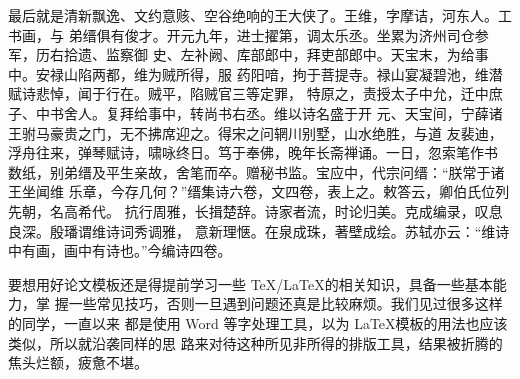 \documentclass[../Main/thesis.tex]{subfiles}
\begin{document}
最后就是清新飘逸、文约意赅、空谷绝响的王大侠了。王维，字摩诘，河东人。工书画，与
弟缙俱有俊才。开元九年，进士擢第，调太乐丞。坐累为济州司仓参军，历右拾遗、监察御
史、左补阙、库部郎中，拜吏部郎中。天宝末，为给事中。安禄山陷两都，维为贼所得，服
药阳喑，拘于菩提寺。禄山宴凝碧池，维潜赋诗悲悼，闻于行在。贼平，陷贼官三等定罪，
特原之，责授太子中允，迁中庶子、中书舍人。复拜给事中，转尚书右丞。维以诗名盛于开
元、天宝间，宁薛诸王驸马豪贵之门，无不拂席迎之。得宋之问辋川别墅，山水绝胜，与道
友裴迪，浮舟往来，弹琴赋诗，啸咏终日。笃于奉佛，晚年长斋禅诵。一日，忽索笔作书
数纸，别弟缙及平生亲故，舍笔而卒。赠秘书监。宝应中，代宗问缙：“朕常于诸王坐闻维
乐章，今存几何？”缙集诗六卷，文四卷，表上之。敕答云，卿伯氏位列先朝，名高希代。
抗行周雅，长揖楚辞。诗家者流，时论归美。克成编录，叹息良深。殷璠谓维诗词秀调雅，
意新理惬。在泉成珠，著壁成绘。苏轼亦云：“维诗中有画，画中有诗也。”今编诗四卷。

要想用好论文模板还是得提前学习一些 \TeX/\LaTeX{}的相关知识，具备一些基本能力，掌
握一些常见技巧，否则一旦遇到问题还真是比较麻烦。我们见过很多这样的同学，一直以来
都是使用 Word 等字处理工具，以为 \LaTeX{}模板的用法也应该类似，所以就沿袭同样的思
路来对待这种所见非所得的排版工具，结果被折腾的焦头烂额，疲惫不堪。
\end{document}
